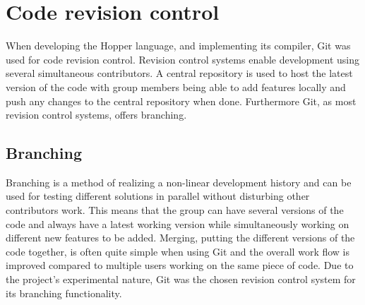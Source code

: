 \section{Code revision control}



When developing the Hopper language, and implementing its compiler, Git was used for code revision control.
Revision control systems enable development using several simultaneous contributors.
A central repository is used to host the latest version of the code with group members
being able to add features locally and push any changes to the central repository when done.  
Furthermore Git, as most revision control systems, offers branching. 

\subsection{Branching}


Branching is a method of realizing a non-linear development history and can be used for 
testing different solutions in parallel without disturbing other contributors work.
This means that the group can have several versions of the code and always have a
latest working version while simultaneously working on different new features
to be added. Merging, putting the different versions of the code together, is often
quite simple when using Git and the overall work flow is improved compared to
multiple users working on the same piece of code. 
Due to the project's experimental nature, Git was the chosen revision control system 
for its branching functionality.


